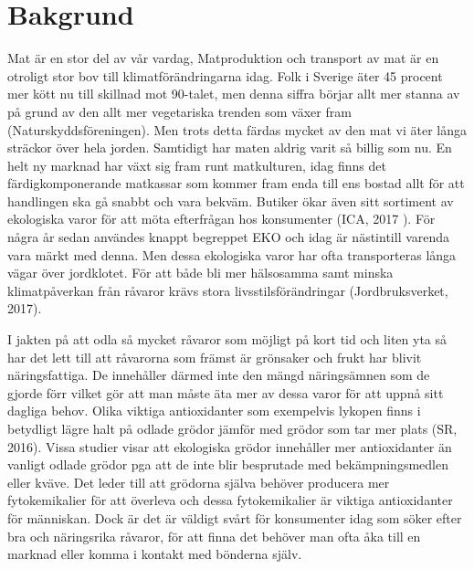 \documentclass[10pt,a4paper,oneside]{article}
\begin{document}
\section{Bakgrund}
Mat är en stor del av vår vardag, Matproduktion och transport av mat är en otroligt stor bov till klimatförändringarna idag. Folk i Sverige äter 45 procent mer kött nu till skillnad mot 90-talet, men denna siffra börjar allt mer stanna av på grund av den allt mer vegetariska trenden som växer fram (Naturskyddsföreningen). Men trots detta färdas mycket av den mat vi äter långa sträckor över hela jorden. Samtidigt har maten aldrig varit så billig som nu. En helt ny marknad har växt sig fram runt matkulturen, idag finns det färdigkomponerande matkassar som kommer fram enda till ens bostad allt för att handlingen ska gå snabbt och vara bekväm. Butiker ökar även sitt sortiment av ekologiska varor för att möta efterfrågan hos konsumenter (ICA, 2017 ). För några år sedan användes knappt begreppet EKO och idag är nästintill varenda vara märkt med denna. Men dessa ekologiska varor har ofta transporteras långa vägar över jordklotet. För att både bli mer hälsosamma samt minska klimatpåverkan från råvaror krävs stora livsstilsförändringar (Jordbruksverket, 2017). 
 
I jakten på att odla så mycket råvaror som möjligt på kort tid och liten yta så har det lett till att råvarorna som främst är grönsaker och frukt har blivit näringsfattiga. De innehåller därmed inte den mängd näringsämnen som de gjorde förr vilket gör att man måste äta mer av dessa varor för att uppnå sitt dagliga behov. Olika viktiga antioxidanter som exempelvis lykopen finns i betydligt lägre halt på odlade grödor jämför med grödor som tar mer plats (SR, 2016). Vissa studier visar att ekologiska grödor innehåller mer antioxidanter än vanligt odlade grödor pga att de inte blir besprutade med bekämpningsmedlen eller kväve. Det leder till att grödorna själva behöver producera mer fytokemikalier för att överleva och dessa fytokemikalier är viktiga antioxidanter för människan. Dock är det är väldigt svårt för konsumenter idag som söker efter bra och näringsrika råvaror, för att finna det behöver man ofta åka till en marknad eller komma i kontakt med bönderna själv.
 
\end{document}
